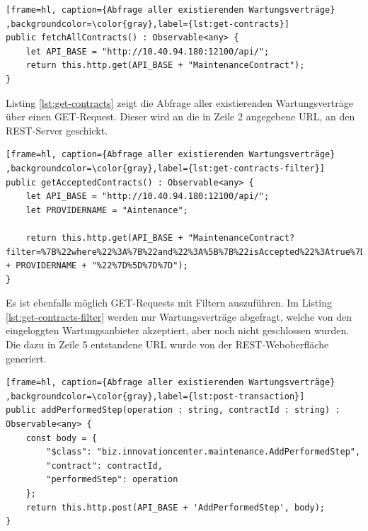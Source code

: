 \begin{lstfloat}
\begin{lstlisting}[frame=hl, caption={Abfrage aller existierenden Wartungsverträge} ,backgroundcolor=\color{gray},label={lst:get-contracts}]
public fetchAllContracts() : Observable<any> {
    let API_BASE = "http://10.40.94.180:12100/api/";
    return this.http.get(API_BASE + "MaintenanceContract");
}
\end{lstlisting} 
\end{lstfloat}

Listing \ref{lst:get-contracts} zeigt die Abfrage aller existierenden Wartungsverträge über einen GET-Request. Dieser wird an die in Zeile 2 angegebene URL, an den REST-Server geschickt.

\begin{lstfloat}
\begin{lstlisting}[frame=hl, caption={Abfrage aller existierenden Wartungsverträge} ,backgroundcolor=\color{gray},label={lst:get-contracts-filter}]
public getAcceptedContracts() : Observable<any> {
    let API_BASE = "http://10.40.94.180:12100/api/";
    let PROVIDERNAME = "Aintenance";

    return this.http.get(API_BASE + "MaintenanceContract?filter=%7B%22where%22%3A%7B%22and%22%3A%5B%7B%22isAccepted%22%3Atrue%7D%2C%7B%22isClosed%22%3Afalse%7D%2C%20%7B%22maintenanceProvider%22%3A%22resource%3Abiz.innovationcenter.maintenance.MaintenanceProvider%23" + PROVIDERNAME + "%22%7D%5D%7D%7D");
}
\end{lstlisting} 
\end{lstfloat}

Es ist ebenfalls möglich GET-Requests mit Filtern auszuführen. Im Listing \ref{lst:get-contracts-filter} werden nur Wartungsverträge abgefragt, welche von den eingeloggten Wartungsanbieter akzeptiert, aber noch nicht geschlossen wurden. Die dazu in Zeile 5 entstandene URL wurde von der REST-Weboberfläche generiert. 

\begin{lstfloat}
\begin{lstlisting}[frame=hl, caption={Abfrage aller existierenden Wartungsverträge} ,backgroundcolor=\color{gray},label={lst:post-transaction}]
public addPerformedStep(operation : string, contractId : string) : Observable<any> {
    const body = {
        "$class": "biz.innovationcenter.maintenance.AddPerformedStep",
        "contract": contractId,
        "performedStep": operation
    };
    return this.http.post(API_BASE + 'AddPerformedStep', body);
}
\end{lstlisting} 
\end{lstfloat}

